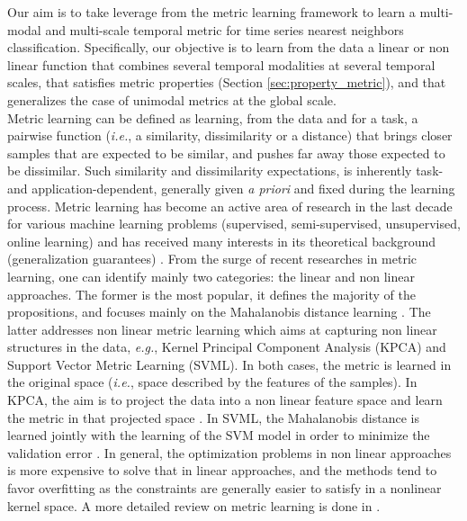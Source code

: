 Our aim is to take leverage from the metric learning framework \cite{Weinberger2009,Bellet2012} to learn a multi-modal and multi-scale temporal metric for time series nearest neighbors classification. Specifically, our objective is to learn from the data a linear or non linear function that combines several temporal modalities at several temporal scales, that satisfies metric properties (Section \ref{sec:property_metric}), and that generalizes the case of unimodal metrics at the global scale. \\
Metric learning can be defined as learning, from the data and for a task, a pairwise function (\textit{i.e.}, a similarity, dissimilarity or a distance) that brings closer samples that are expected to be similar, and pushes far away those expected to be dissimilar. Such similarity and dissimilarity expectations, is inherently task- and application-dependent, generally given \textit{a priori} and fixed during the learning process. Metric learning has become an active area of research in the last decade for various machine learning problems (supervised, semi-supervised, unsupervised, online learning) and has received many interests in its theoretical background (generalization guarantees) \cite{Bellet2013}. From the surge of recent researches in metric learning, one can identify mainly two categories: the linear and non linear approaches. The former is the most popular, it defines the majority of the propositions, and focuses mainly on the Mahalanobis distance learning \cite{Weinberger2009}. The latter addresses non linear metric learning which aims at capturing non linear structures in the data, \textit{e.g.}, Kernel Principal Component Analysis (KPCA) and Support Vector Metric Learning (SVML). In both cases, the metric is learned in the original space (\textit{i.e.}, space described by the features of the samples). In KPCA, the aim is to project the data into a non linear feature space and learn the metric in that projected space \cite{Zhang2010,Chatpatanasiri2010}. In SVML, the Mahalanobis distance is learned jointly with the learning of the SVM model in order to minimize the validation error \cite{Xu2012}. In general, the optimization problems in non linear approaches is more expensive to solve that in linear approaches, and the methods tend to favor overfitting as the constraints are generally easier to satisfy in a nonlinear kernel space. A more detailed review on metric learning is done in \cite{Bellet2013}.\\

